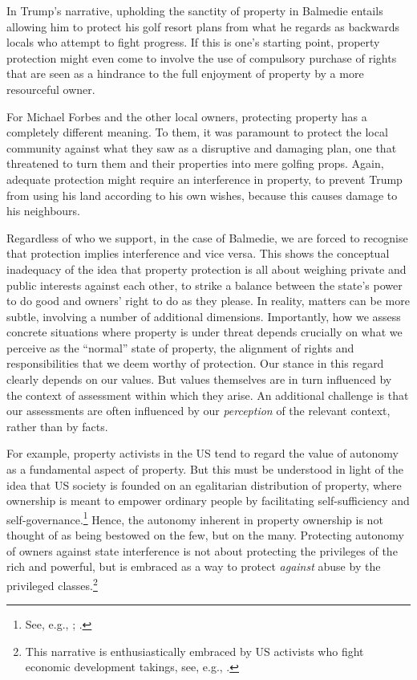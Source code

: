 In Trump's narrative, upholding the sanctity of property in Balmedie entails allowing him to protect his golf resort plans from what he regards as backwards locals who attempt to fight progress. If this is one's starting point, property protection might even come to involve the use of compulsory purchase of rights that are seen as a hindrance to the full enjoyment of property by a more resourceful owner. 

For Michael Forbes and the other local owners, protecting property has a completely different meaning. To them, it was paramount to protect the local community against what they saw as a disruptive and damaging plan, one that threatened to turn them and their properties into mere golfing props. Again, adequate protection might require an interference in property, to prevent Trump from using his land according to his own wishes, because this causes damage to his neighbours. 

Regardless of who we support, in the case of Balmedie, we are forced to recognise that protection implies interference and vice versa. This shows the conceptual inadequacy of the idea that property protection is all about weighing private and public interests against each other, to strike a balance between the state's power to do good and owners' right to do as they please. In reality, matters can be more subtle, involving a number of additional dimensions. Importantly, how we assess concrete situations where property is under threat depends crucially on what we perceive as the ``normal'' state of property, the alignment of rights and responsibilities that we deem  worthy of protection. Our stance in this regard clearly depends on our values. But values themselves are in turn influenced by the context of assessment within which they arise. An additional challenge is that our assessments are often influenced by our \emph{perception} of the relevant context, rather than by facts.

For example, property activists in the US tend to regard the value of autonomy as a fundamental aspect of property. But this must be understood in light of the idea that US society is founded on an egalitarian distribution of property, where ownership is meant to empower ordinary people by facilitating self-sufficiency and self-governance.\footnote{See, e.g., \cite[173]{ely07}; \cite{rose96}.} Hence, the autonomy inherent in property ownership is not thought of as being bestowed on the few, but on the many. Protecting autonomy of owners against state interference is not about protecting the privileges of the rich and powerful, but is embraced as a way to protect {\it against} abuse by the privileged classes.\footnote{This narrative is enthusiastically embraced by US activists who fight economic development takings, see, e.g., \cite{castle15}.} 

